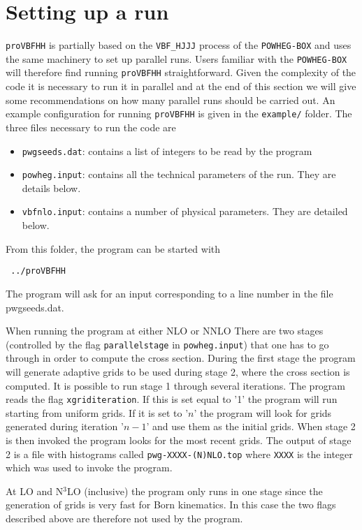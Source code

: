 \documentclass[12pt,a4]{article}
\newcommand{\provbfhh}{\texttt{proVBFHH}\xspace}
\begin{document}
\section{Setting up a run}
\provbfhh is partially based on the \texttt{VBF\_HJJJ} process of the
\texttt{POWHEG-BOX} and uses the same machinery to set up parallel
runs.
%
Users familiar with the \texttt{POWHEG-BOX} will therefore find
running \provbfhh straightforward.
%
Given the complexity of the code it is necessary to run it in parallel
and at the end of this section we will give some recommendations on
how many parallel runs should be carried out.
%
An example configuration for running \provbfhh is given in the
\texttt{example/} folder.
%
The three files necessary to run the code are
\begin{itemize}
\item \texttt{pwgseeds.dat}: contains a list of integers to be read by
  the program
\item \texttt{powheg.input}: contains all the technical parameters of
  the run. They are details below.
\item \texttt{vbfnlo.input}: contains a number of physical
  parameters. They are detailed below.
\end{itemize}
From this folder, the program can be started with
\begin{verbatim}
 ../proVBFHH
\end{verbatim}
%
The program will ask for an input corresponding to a line number in
the file pwgseeds.dat.

When running the program at either NLO or NNLO There are two stages
(controlled by the flag \texttt{parallelstage} in
\texttt{powheg.input}) that one has to go through in order to compute
the cross section.
%
During the first stage the program will generate adaptive grids to be
used during stage 2, where the cross section is computed.
%
It is possible to run stage 1 through several iterations.
%
The program reads the flag \texttt{xgriditeration}.
%
If this is set equal to '1' the program will run starting from uniform
grids.
%
If it is set to '$n$' the program will look for grids generated during
iteration '$n-1$' and use them as the initial grids.
%
When stage 2 is then invoked the program looks for the most recent
grids.
%
The output of stage 2 is a file with histograms called
\texttt{pwg-XXXX-(N)NLO.top} where \texttt{XXXX} is the integer which
was used to invoke the program.

At LO and N$^3$LO (inclusive) the program only runs in one stage since
the generation of grids is very fast for Born kinematics.
%
In this case the two flags described above are therefore not used by
the program.
\end{document}
